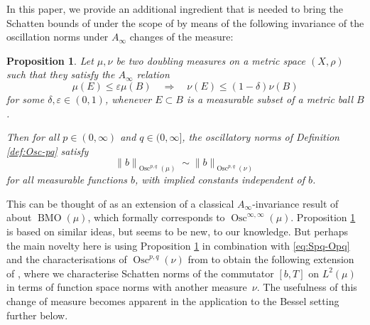 \documentclass[reqno]{amsart}
\newcommand{\Norm}[2]{\|#1\|_{#2}}
\newcommand{\BMO}[0]{\operatorname{BMO}}
\newcommand{\eps}[0]{\varepsilon}
\theoremstyle{plain}
\newtheorem{proposition}[equation]{Proposition}
\theoremstyle{definition}
\theoremstyle{remark}
\begin{document}
In this paper, we provide an additional ingredient that is needed to bring the Schatten bounds of \cite{FLSZ} under the scope of \cite{Hyt:Sp,HK:W1p} by means of the following invariance of the oscillation norms under $A_\infty$ changes of the measure:

\begin{proposition}\label{prop:Osc(mu)=Osc(nu)}
Let $\mu,\nu$ be two doubling measures on a metric space $(X,\rho)$ such that they satisfy the $A_\infty$ relation
\begin{equation}\label{eq:Ainfty}
  \mu(E)\leq\eps\mu(B)\quad\Rightarrow\quad\nu(E)\leq(1-\delta)\nu(B)
\end{equation}
for some $\delta,\eps\in(0,1)$, whenever $E\subset B$ is a measurable subset of a metric ball $B$.

Then for all $p\in(0,\infty)$ and $q\in(0,\infty]$, the oscillatory norms of Definition \ref{def:Osc-pq} satisfy
\begin{equation*}
   \Norm{b}{\operatorname{Osc}^{p,q}(\mu)}
   \sim\Norm{b}{\operatorname{Osc}^{p,q}(\nu)}
\end{equation*}
for all measurable functions $b$, with implied constants independent of $b$.
\end{proposition}

This can be thought of as an extension of a classical $A_\infty$-invariance result of \cite[Theorem 5]{MW:75} about $\BMO(\mu)$, which formally corresponds to $\operatorname{Osc}^{\infty,\infty}(\mu)$. Proposition \ref{prop:Osc(mu)=Osc(nu)} is based on similar ideas, but seems to be new, to our knowledge. But perhaps the main novelty here is using Proposition \ref{prop:Osc(mu)=Osc(nu)} in combination with \eqref{eq:Spq-Opq} and the characterisations of $\operatorname{Osc}^{p,q}(\nu)$ from \cite{Hyt:Sp,HK:W1p} to obtain the following extension of \cite[Theorem 1.1]{Hyt:Sp}, where we characterise Schatten norms of the commutator $[b,T]$ on $L^2(\mu)$ in terms of function space norms with another measure~$\nu$. The usefulness of this change of measure becomes apparent in the application to the Bessel setting further below.
\end{document}
